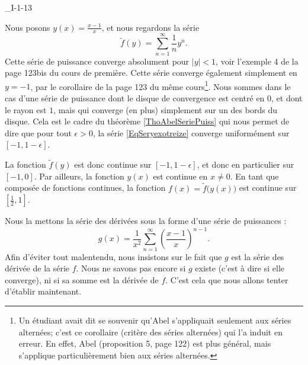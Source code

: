 

\begin{corrige}{_I-1-13}

Nous posons $y(x)=\frac{ x-1 }{ x }$, et nous regardons la série
\begin{equation}		\label{EqSeryexotreize}
	\tilde f(y)=\sum_{n=1}^{\infty}\frac{1}{ n }y^n.
\end{equation}
Cette série de puissance converge absolument pour $| y |<1$, voir l'exemple 4 de la page 123bis du cours de première. Cette série converge également simplement en $y=-1$, par le corollaire de la page 123 du même cours\footnote{Un étudiant avait dit se souvenir qu'Abel s'appliquait seulement aux séries alternées; c'est ce corollaire (critère des séries alternées) qui l'a induit en erreur. En effet, Abel (proposition 5, page 122) est plus général, mais s'applique particulièrement bien aux séries alternées.}. Nous sommes dans le cas d'une série de puissance dont le disque de convergence est centré en $0$, et dont le rayon est $1$, mais qui converge (en plus) simplement sur un des bords du disque. Cela est le cadre du théorème \ref{ThoAbelSeriePuiss} qui nous permet de dire que pour tout $\epsilon>0$, la série \eqref{EqSeryexotreize} converge uniformément sur $[-1,1-\epsilon]$.

La fonction $\tilde f(y)$ est donc continue sur $[-1,1-\epsilon]$, et donc en particulier sur $[-1,0]$. Par ailleurs, la fonction $y(x)$ est continue en $x\neq 0$. En tant que composée de fonctions continues, la fonction $f(x)=\tilde f\big( y(x) \big)$ est continue sur $[\frac{ 1 }{2},1]$.

Nous la mettons la série des dérivées sous la forme d'une série de puissances :
\begin{equation}		\label{EqSerieDerrTreize}
	g(x)=\frac{1}{ x^2 }\sum_{n=1}^{\infty} \left( \frac{ x-1 }{ x } \right)^{n-1}.
\end{equation}
Afin d'éviter tout malentendu, nous insistons sur le fait que $g$ est la série des dérivée de la série $f$. Nous ne savons pas encore si $g$ existe (c'est à dire si elle converge), ni si sa somme est la dérivée de $f$. C'est cela que nous allons tenter d'établir maintenant.


\end{corrige}

